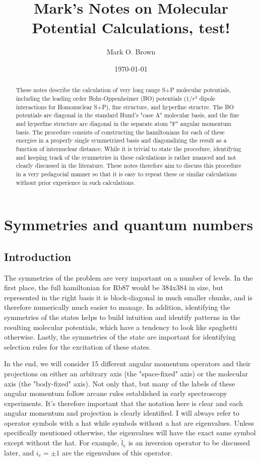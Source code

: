 \documentclass[prl, longbibliography]{revtex4-2}
\begin{document}
\title{Mark's Notes on Molecular Potential Calculations, test!}
\author{Mark O. Brown}
\date{\today}

\begin{abstract}
These notes describe the calculation of very long range S+P molecular potentials, including the leading order Bohr-Oppenheimer (BO) potentials ($1/r^3$ dipole interactions for Homonuclear S+P), fine structure, and
hyperfine structre. 
The BO potentials are diagonal in the standard Hund's "case A" molecular basis, and the fine and hyperfine structure are diagonal in the separate atom "F" angular momentum basis. 
The procedure consists of constructing the hamiltonians for each of these energies in a properly single symmetrized  basis and diagonalizing the result as a function of internuclear distance.
While it is trivial to state the procedure, identifying and keeping track of the symmetries in these calculations is rather nuanced and not clearly discussed in the literature. 
These notes therefore aim to discuss this procedure in a very pedagocial manner so that it is easy to repeat these or similar calculations without prior experience in such calculations. 
\end{abstract}

\maketitle

\section{Symmetries and quantum numbers}

\subsection{Introduction}
The symmetries of the problem are very important on a number of levels. 
In the first place, the full hamiltonian for Rb87 would be 384x384 in size, but represented in the right basis it is block-diagonal in much smaller chunks, and is therefore numerically much easier to manage. 
In addition, identifying the symmetries of the states helps to build intuition and identify patterns in the resulting molecular potentials, which have a tendency to look like spaghetti otherwise. 
Lastly, the symmetries of the state are important for identifying selection rules for the excitation of these states.

In the end, we will consider 15 different angular momentum operators and their projections on either an arbitrary axis (the "space-fixed" axis) or the molecular axis (the "body-fixed" axis). 
Not only that, but many of the labels of these angular momentum follow arcane rules established in early spectroscopy experiments.
It's therefore important that the notation here is clear and each angular momentum and projection is clearly identified. 
I will always refer to operator symbols with a hat while symbols without a hat are eigenvalues. 
Unless specifically mentioned otherwise, the eigenvalues will have the exact same symbol except without the hat. For example, $\hat{\mathbb{i}}_{e}$ is an inversion operator to be discussed later, and $i_e=\pm 1$ are the eigenvalues of this operator. 
\end{document}
